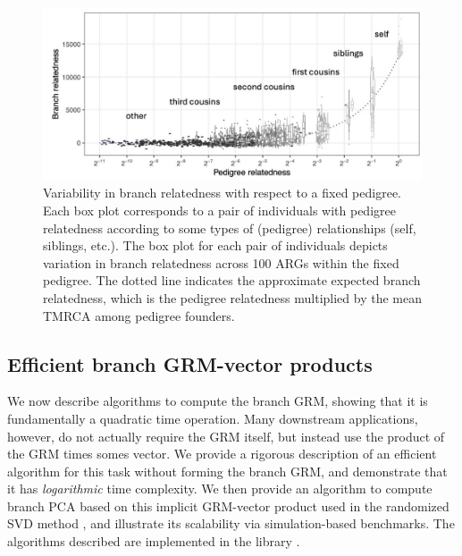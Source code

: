 \begin{figure}
    \centering
    \includegraphics[width=\textwidth]{Figures/Fig5_branch_recap_sim_boxplot_combined_behind2.jpg}
    \caption{Variability in branch relatedness with respect to a fixed pedigree.
    Each box plot corresponds to a pair of individuals with pedigree relatedness
    according to some types of (pedigree) relationships (self, siblings, etc.).
    The box plot for each pair of individuals depicts variation in branch relatedness across 100 ARGs within the fixed pedigree.
    The dotted line indicates the approximate expected branch relatedness,
    which is the pedigree relatedness multiplied by the mean TMRCA among pedigree founders.}
    \label{fig:boxplots}
\end{figure}



% 


\subsection{Efficient branch GRM-vector products}\label{subsec:matvec}

We now describe algorithms to compute the branch GRM, showing that it is 
fundamentally a quadratic time operation. Many downstream applications, however,
do not actually require the GRM itself, but instead use the product of the 
GRM times somes vector. We provide a rigorous description of an efficient 
algorithm for this task without forming the branch GRM,
and demonstrate that it has \emph{logarithmic} time complexity.
We then provide an algorithm to compute branch PCA based on this implicit GRM-vector
product used in the randomized SVD method \citep{halko2011findingstructure},
and illustrate its scalability
via simulation-based benchmarks.
The algorithms described are implemented in
the \tskit{} library \citep{ralph2020efficiently, kelleher2024tskit}.

